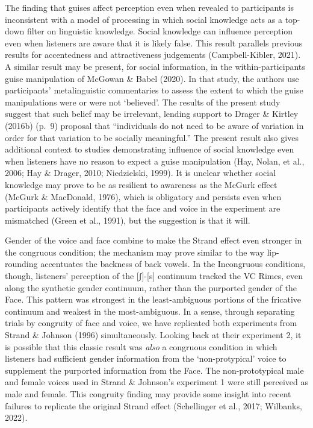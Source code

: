\documentclass[
  letterpaper,
  DIV=11,
  numbers=noendperiod]{scrartcl}
\begin{document}
The finding that guises affect perception even when revealed to
participants is inconsistent with a model of processing in which social
knowledge acts as a top-down filter on linguistic knowledge. Social
knowledge can influence perception even when listeners are aware that it
is likely false. This result parallels previous results for accentedness
and attractiveness judgements (Campbell-Kibler, 2021). A similar result
may be present, for social information, in the within-participants guise
manipulation of McGowan \& Babel (2020). In that study, the authors use
participants' metalinguistic commentaries to assess the extent to which
the guise manipulations were or were not `believed'. The results of the
present study suggest that such belief may be irrelevant, lending
support to Drager \& Kirtley (2016b) (p.~9) proposal that ``individuals
do not need to be aware of variation in order for that variation to be
socially meaningful.'' The present result also gives additional context
to studies demonstrating influence of social knowledge even when
listeners have no reason to expect a guise manipulation (Hay, Nolan, et
al., 2006; Hay \& Drager, 2010; Niedzielski, 1999). It is unclear
whether social knowledge may prove to be as resilient to awareness as
the McGurk effect (McGurk \& MacDonald, 1976), which is obligatory and
persists even when participants actively identify that the face and
voice in the experiment are mismatched (Green et al., 1991), but the
suggestion is that it will.

Gender of the voice and face combine to make the Strand effect even
stronger in the congruous condition; the mechanism may prove similar to
the way lip-rounding accentuates the backness of back vowels. In the
Incongruous conditions, though, listeners' perception of the
{[}ʃ{]}-{[}s{]} continuum tracked the VC Rimes, even along the synthetic
gender continuum, rather than the purported gender of the Face. This
pattern was strongest in the least-ambiguous portions of the fricative
continuum and weakest in the most-ambiguous. In a sense, through
separating trials by congruity of face and voice, we have replicated
both experiments from Strand \& Johnson (1996) simultaneously. Looking
back at their experiment 2, it is possible that this classic result was
\emph{also} a congruous condition in which listeners had sufficient
gender information from the `non-protypical' voice to supplement the
purported information from the Face. The non-prototypical male and
female voices used in Strand \& Johnson's experiment 1 were still
perceived as male and female. This congruity finding may provide some
insight into recent failures to replicate the original Strand effect
(Schellinger et al., 2017; Wilbanks, 2022).
\end{document}
